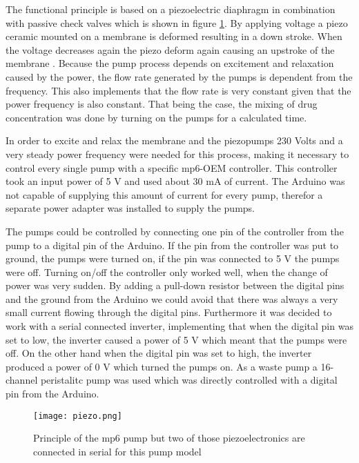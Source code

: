 The functional principle is based on a piezoelectric diaphragm in combination with passive check valves which is shown in figure \ref{figure:piezo}. By applying voltage a piezo ceramic mounted on a membrane is deformed resulting in a down stroke. When the voltage decreases again the piezo deform again causing an upstroke of the membrane \cite{piezo_pumps}. Because the pump process depends on excitement and relaxation caused by the power, the flow rate generated by the pumps is dependent from the frequency. This also implements that the flow rate is very constant given that the power frequency is also constant. That being the case, the mixing of drug concentration was done by turning on the pumps for a calculated time.

In order to excite and relax the membrane and the piezopumps 230 Volts and a very steady power frequency were needed for this process, making it necessary to control every single pump with a specific mp6-OEM controller. This controller took an input power of 5 V and used about 30 mA of current. The Arduino was not capable of supplying this amount of current for every pump, therefor a separate power adapter was installed to supply the pumps. 

The pumps could be controlled by connecting one pin of the controller from the pump to a digital pin of the Arduino. 
If the pin from the controller was put to ground, the pumps were turned on, if the pin was connected to 5 V the pumps were off. Turning on/off the controller only worked well, when the change of power was very sudden. 
By adding a pull-down resistor between the digital pins and the ground from the Arduino we could avoid that there was always a very small current flowing through the digital pins. Furthermore it was decided to work with a serial connected inverter, implementing that when the digital pin was set to low, the inverter caused a power of 5 V which meant that the pumps were off. On the other hand when the digital pin was set to high, the inverter produced a power of 0 V which turned the pumps on.  
As a waste pump a 16-channel peristalitc pump was used which was directly controlled with a digital pin from the Arduino. 
\label{section:pumps}
\begin{figure}
	\texttt{[image: piezo.png]}
	\caption{Principle of the mp6 pump but two of those piezoelectronics are connected in serial for this pump model \cite{piezo_pumps}}
	\label{figure:piezo}
\end{figure}

